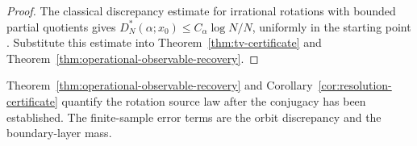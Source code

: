 \begin{proof}
The classical discrepancy estimate for irrational rotations with bounded
partial quotients gives
$D_N^*(\alpha;x_0)\le C_\alpha\log N/N$, uniformly in the starting point
\cite{KuipersNiederreiter1974,DrmotaTichy1997}.  Substitute this estimate into
Theorem~\ref{thm:tv-certificate} and
Theorem~\ref{thm:operational-observable-recovery}.
\end{proof}

\begin{remark}
Theorem~\ref{thm:operational-observable-recovery} and Corollary~\ref{cor:resolution-certificate} quantify the rotation source law after the conjugacy has been established. The finite-sample error terms are the orbit discrepancy and the boundary-layer mass.
\end{remark}
